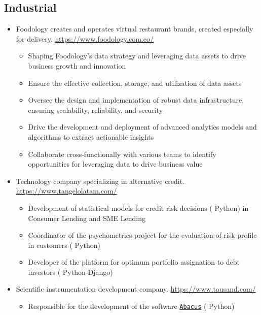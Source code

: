 \documentclass[11pt, letterpaper, sans]{moderncv}        %
\begin{document}
	\subsection{Industrial}
	\begin{itemize}
		\item
		{
			{
				Foodology creates and operates virtual restaurant brands, created especially for delivery. \url{https://www.foodology.com.co/}
				\vspace{3pt}
				\begin{itemize}
					\item Shaping Foodology's data strategy and leveraging data assets to drive business growth and innovation
					\item Ensure the effective collection, storage, and utilization of data assets
					\item Oversee the design and implementation of robust data infrastructure, ensuring scalability, reliability, and security
					\item Drive the development and deployment of advanced analytics models and algorithms to extract actionable insights
					\item Collaborate cross-functionally with various teams to identify opportunities for leveraging data to drive business value
				\end{itemize}
			}
		}
		\item
		{
			{
				Technology company specializing in alternative credit. \url{https://www.tangelolatam.com/}
				\vspace{3pt}
				\begin{itemize}
					\item Development of statistical models for credit risk decisions ({\color{blue} Python}) in Consumer Lending and SME Lending
					\item Coordinator of the psychometrics project for the evaluation of risk profile in customers ({\color{blue} Python})
					\item Developer of the platform for optimum portfolio assignation to debt investors ({\color{blue} Python-Django})
				\end{itemize}
			}
		}
		\item
		{
			{
				Scientific instrumentation development company. \url{https://www.tausand.com/}
				\vspace{3pt}
				\begin{itemize}
					\item Responsible for the development of the software \href{https://www.tausand.com/downloads/}{\texttt{Abacus}} ({\color{blue} Python})
				\end{itemize}
			}
		}
		\vspace{6pt}
	\end{itemize}
\end{document}
